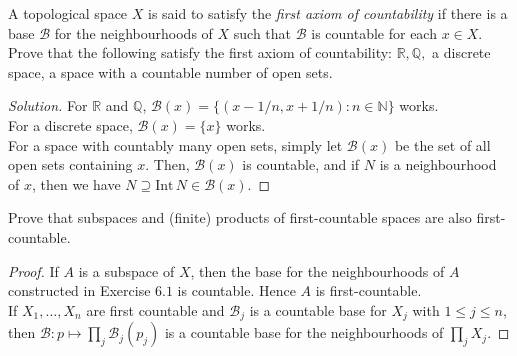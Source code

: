 \documentclass[12pt]{article}
\newenvironment{problem}[2][Problem]{\begin{trivlist}
\item[\hskip \labelsep {\bfseries #1}\hskip \labelsep {\bfseries #2.}]}{\end{trivlist}}
\newcommand{\Int}[1]{\text{Int}\,#1}
\newcommand{\N}{\mathbb{N}}
\newcommand{\Q}{\mathbb{Q}}
\newcommand{\R}{\mathbb{R}}
\newenvironment{solution}
  {\renewcommand\qedsymbol{$\blacksquare$}\begin{proof}[Solution]}
{\end{proof}}
\begin{document}
\begin{problem}{6.3}
  A topological space $X$ is said to satisfy the 
  \textit{first axiom of countability} if there is a base $\mathcal{B}$
  for the neighbourhoods of $X$ such that $\mathcal{B}$ is countable
  for each $x\in X$.
  Prove that the following satisfy the first axiom of countability:
  $\R,\Q,$ a discrete space, a space with a countable number of open sets.
\end{problem}
\begin{solution}
  For $\R$ and $\Q$, $\mathcal{B}(x)=\{(x-1/n,x+1/n):n\in\N\}$ works.\\
  \indent For a discrete space, $\mathcal{B}(x) = \{x\}$ works.\\
  \indent For a space with countably many open sets, simply let 
  $\mathcal{B}(x)$ be the set of all open sets containing $x$.
  Then, $\mathcal{B}(x)$ is countable, and if $N$ is a neighbourhood of 
  $x$, then we have $N\supseteq\Int N\in\mathcal{B}(x)$.
\end{solution}

\newpage

\begin{problem}{6.4}
  Prove that subspaces and (finite) products of first-countable spaces
  are also first-countable.
\end{problem}
\begin{proof}
  If $A$ is a subspace of $X$, then the base for the neighbourhoods of $A$
  constructed in Exercise $6.1$ is countable.
  Hence $A$ is first-countable. \\
  \indent If $X_1,\dots,X_n$ are first countable and $\mathcal{B}_j$ is a
  countable base for $X_j$ with $1\leq j\leq n$, then 
  $\mathcal{B}:p\mapsto \prod_j \mathcal{B}_j(p_j)$ is a countable base
  for the neighbourhoods of $\prod_j X_j$.
\end{proof}
\end{document}
